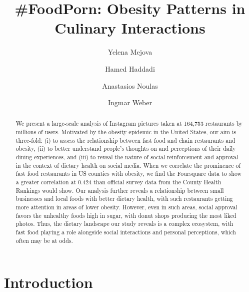 \documentclass{sig-alternate-2013}
\begin{document}
\title{\#FoodPorn: Obesity Patterns in Culinary Interactions}

\author[1]{Yelena Mejova}
\author[1,2]{Hamed Haddadi}
\author[3]{Anastasios Noulas}
\author[1]{Ingmar Weber}



\maketitle
\begin{abstract}
We present a large-scale analysis of Instagram pictures taken at 164,753 restaurants by millions of users. Motivated by the obesity epidemic in the United States, our aim is three-fold: (i) to assess the relationship between fast food and chain restaurants and obesity, (ii) to better understand people's thoughts on and perceptions of their daily dining experiences, and (iii) to reveal the nature of social reinforcement and approval in the context of dietary health on social media. When we correlate the prominence of fast food restaurants in US counties with obesity, we find the Foursquare data to show a greater correlation at 0.424 than official survey data from the County Health Rankings would show. Our analysis further reveals a relationship between small businesses and local foods with better dietary health, with such restaurants getting more attention in areas of lower obesity. However, even in such areas, social approval favors the unhealthy foods high in sugar, with donut shops producing the most liked photos. Thus, the dietary landscape our study reveals is a complex ecosystem, with fast food playing a role alongside social interactions and personal perceptions, which often may be at odds.
\end{abstract}







\section{Introduction}
\label{sec:intro}
\end{document}
